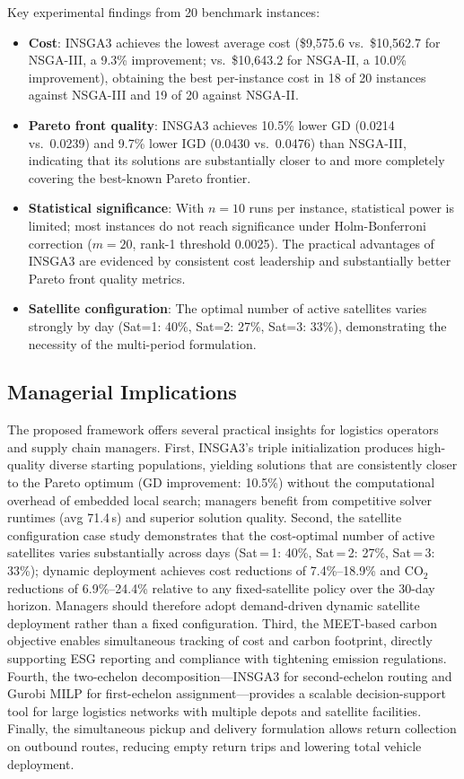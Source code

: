 \documentclass[11pt, a4paper]{article}
\numberwithin{equation}{section}
\begin{document}
Key experimental findings from 20 benchmark instances:
\begin{itemize}
  \item \textbf{Cost}: INSGA3 achieves the lowest average cost
        (\$9{,}575.6 vs.\ \$10{,}562.7 for NSGA-III, a 9.3\% improvement;
        vs.\ \$10{,}643.2 for NSGA-II, a 10.0\% improvement), obtaining
        the best per-instance cost in 18 of 20 instances against NSGA-III
        and 19 of 20 against NSGA-II\@.
  \item \textbf{Pareto front quality}: INSGA3 achieves 10.5\% lower GD
        (0.0214 vs.\ 0.0239) and 9.7\% lower IGD (0.0430 vs.\ 0.0476)
        than NSGA-III, indicating that its solutions are substantially
        closer to and more completely covering the best-known Pareto frontier.
  \item \textbf{Statistical significance}: With $n=10$ runs per instance,
        statistical power is limited; most instances do not reach significance
        under Holm-Bonferroni correction ($m=20$, rank-1 threshold 0.0025).
        The practical advantages of INSGA3 are evidenced by consistent
        cost leadership and substantially better Pareto front quality metrics.
  \item \textbf{Satellite configuration}: The optimal number of active
        satellites varies strongly by day (Sat=1: 40\%, Sat=2: 27\%,
        Sat=3: 33\%), demonstrating the necessity of the multi-period
        formulation.
\end{itemize}

\subsection{Managerial Implications}

The proposed framework offers several practical insights for logistics operators
and supply chain managers.  First, INSGA3's triple initialization produces
high-quality diverse starting populations, yielding solutions that are
consistently closer to the Pareto optimum (GD improvement: 10.5\%) without
the computational overhead of embedded local search; managers benefit from
competitive solver runtimes (avg 71.4\,s) and superior solution quality.  Second, the satellite configuration case study
demonstrates that the cost-optimal number of active satellites varies
substantially across days (Sat\,=\,1: 40\%, Sat\,=\,2: 27\%, Sat\,=\,3:
33\%); dynamic deployment achieves cost reductions of 7.4\%--18.9\% and
CO$_2$ reductions of 6.9\%--24.4\% relative to any fixed-satellite policy
over the 30-day horizon.  Managers should therefore adopt demand-driven
dynamic satellite deployment rather than a fixed configuration.  Third, the MEET-based carbon
objective enables simultaneous tracking of cost and carbon footprint, directly
supporting ESG reporting and compliance with tightening emission regulations.
Fourth, the two-echelon decomposition---INSGA3 for second-echelon routing
and Gurobi MILP for first-echelon assignment---provides a scalable
decision-support tool for large logistics networks with multiple depots and
satellite facilities.  Finally, the simultaneous pickup and delivery formulation
allows return collection on outbound routes, reducing empty return trips and
lowering total vehicle deployment.
\end{document}
